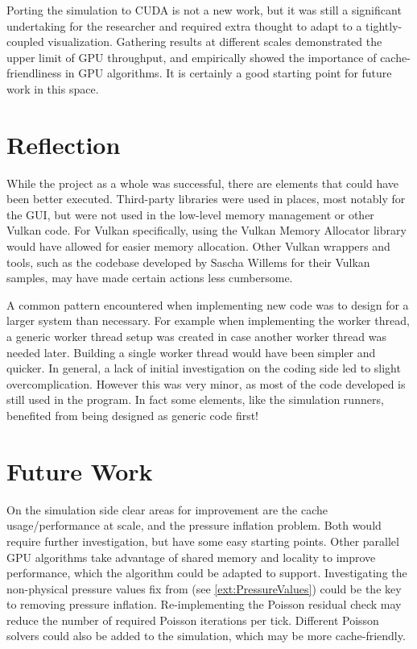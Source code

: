 Porting the simulation to CUDA is not a new work, but it was still a significant undertaking for the researcher and required extra thought to adapt to a tightly-coupled visualization.
Gathering results at different scales demonstrated the upper limit of GPU throughput, and empirically showed the importance of cache-friendliness in GPU algorithms.
It is certainly a good starting point for future work in this space.

\section{Reflection}
While the project as a whole was successful, there are elements that could have been better executed.
Third-party libraries were used in places, most notably for the GUI, but were not used in the low-level memory management or other Vulkan code.
For Vulkan specifically, using the Vulkan Memory Allocator library  would have allowed for easier memory allocation.
Other Vulkan wrappers and tools, such as the codebase developed by Sascha Willems for their Vulkan samples, may have made certain actions less cumbersome.

A common pattern encountered when implementing new code was to design for a larger system than necessary.
For example when implementing the worker thread, a generic worker thread setup was created in case another worker thread was needed later.
Building a single worker thread would have been simpler and quicker.
In general, a lack of initial investigation on the coding side led to slight overcomplication.
However this was very minor, as most of the code developed is still used in the program.
In fact some elements, like the simulation runners, benefited from being designed as generic code first!

\section{Future Work}

On the simulation side clear areas for improvement are the cache usage/performance at scale, and the pressure inflation problem.
Both would require further investigation, but have some easy starting points.
Other parallel GPU algorithms take advantage of shared memory and locality to improve performance, which the algorithm could be adapted to support.
Investigating the non-physical pressure values fix from \cite{book:griebel1998numerical} (see \cref{ext:PressureValues}) could be the key to removing pressure inflation.
Re-implementing the Poisson residual check may reduce the number of required Poisson iterations per tick.
Different Poisson solvers could also be added to the simulation, which may be more cache-friendly.

